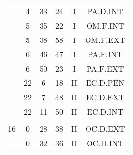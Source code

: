 \documentclass[12pt, a4paper]{article}
\begin{document}
\begin{multicols}{3}
{\begin{tabular}{c c c c c c}
	 	 	 	 & 4 & 33 & 24 & I & PA.D.INT\\%
	 	 	 	 & 5 & 35 & 22 & I & OM.F.INT\\%
	 	 	 	 & 5 & 38 & 58 & I & OM.F.EXT\\%
	 	 	 	 & 6 & 46 & 47 & I & PA.F.INT\\%
	 	 	 	 & 6 & 50 & 23 & I & PA.F.EXT\\%
	 	 	 	 & 22 & 6 & 18 & II & EC.D.PEN\\%
	 	 	 	 & 22 & 7 & 48 & II & EC.D.EXT\\%
	 	 	 	 & 22 & 11 & 50 & II & EC.D.INT\\%
	 	 	 	 & & & & & \\%
	 	 	 	16 & 0 & 28 & 38 & II & OC.D.EXT\\%
	 	 	 	 & 0 & 32 & 36 & II & OC.D.INT\\%
	 	 \end{tabular}
 	}
\end{multicols}
\end{document}
